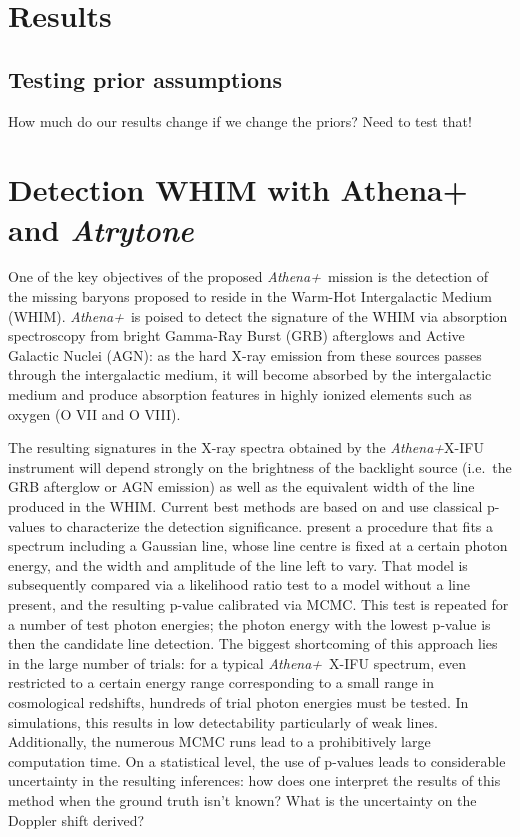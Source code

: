 \documentclass[12pt]{emulateapj}
\newcommand{\project}[1]{\textsl{#1}}
\newcommand{\athena}{\project{Athena+}}
\begin{document}
\section{Results}

\subsection{Testing prior assumptions}

How much do our results change if we change the priors? Need to test that!

\section{Detection WHIM with Athena+ and \textit{Atrytone}}

One of the key objectives of the proposed \athena\ mission is the detection of the missing baryons proposed to reside in the Warm-Hot Intergalactic Medium (WHIM). \athena\ is poised to detect the signature of the WHIM via absorption spectroscopy from bright Gamma-Ray Burst (GRB) afterglows and Active Galactic Nuclei (AGN): as the hard X-ray emission from these sources passes through the intergalactic medium, it will become absorbed by the intergalactic medium and produce absorption features in highly ionized elements such as oxygen (O VII and O VIII). 

The resulting signatures in the X-ray spectra obtained by the \athena X-IFU instrument will depend strongly on the brightness of the backlight source (i.e.\ the GRB afterglow or AGN emission) as well as the equivalent width of the line produced in the WHIM. Current best methods are based on \citep{protassov2002} and use classical p-values to characterize the detection significance. \citep{brand2016} present a procedure that fits a spectrum including a Gaussian line, whose line centre is fixed at a certain photon energy, and the width and amplitude of the line left to vary. That model is subsequently compared via a likelihood ratio test to a model without a line present, and the resulting p-value calibrated via MCMC. This test is repeated for a number of test photon energies; the photon energy with the lowest p-value is then the candidate line detection. The biggest shortcoming of this approach lies in the large number of trials: for a typical \athena\ X-IFU spectrum, even restricted to a certain energy range corresponding to a small range in cosmological redshifts, hundreds of trial photon energies must be tested. In simulations, this results in low detectability particularly of weak lines. Additionally, the numerous MCMC runs lead to a prohibitively large computation time. On a statistical level, the use of p-values leads to considerable uncertainty in the resulting inferences: how does one interpret the results of this method when the ground truth isn't known? What is the uncertainty on the Doppler shift derived? 
\end{document}
